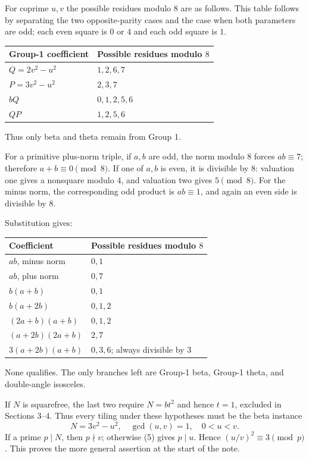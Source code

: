 \documentclass[
  11pt,
]{article}
\begin{document}
For coprime \(u,v\) the possible residues modulo \(8\) are as follows.
This table follows by separating the two opposite-parity cases and the
case when both parameters are odd; each even square is \(0\) or \(4\)
and each odd square is \(1\).

\begin{longtable}[]{@{}ll@{}}
\toprule\noalign{}
Group-1 coefficient & Possible residues modulo \(8\) \\
\midrule\noalign{}
\endhead
\bottomrule\noalign{}
\endlastfoot
\(Q=2v^2-u^2\) & \(1,2,6,7\) \\
\(P=3v^2-u^2\) & \(2,3,7\) \\
\(bQ\) & \(0,1,2,5,6\) \\
\(QP\) & \(1,2,5,6\) \\
\end{longtable}

Thus only beta and theta remain from Group 1.

For a primitive plus-norm triple, if \(a,b\) are odd, the norm modulo
\(8\) forces \(ab\equiv7\); therefore \(a+b\equiv0\pmod8\). If one of
\(a,b\) is even, it is divisible by \(8\): valuation one gives a
nonsquare modulo \(4\), and valuation two gives \(5\pmod8\). For the
minus norm, the corresponding odd product is \(ab\equiv1\), and again an
even side is divisible by \(8\).

Substitution gives:

\begin{longtable}[]{@{}ll@{}}
\toprule\noalign{}
Coefficient & Possible residues modulo \(8\) \\
\midrule\noalign{}
\endhead
\bottomrule\noalign{}
\endlastfoot
\(ab\), minus norm & \(0,1\) \\
\(ab\), plus norm & \(0,7\) \\
\(b(a+b)\) & \(0,1\) \\
\(b(a+2b)\) & \(0,1,2\) \\
\((2a+b)(a+b)\) & \(0,1,2\) \\
\((a+2b)(2a+b)\) & \(2,7\) \\
\(3(a+2b)(a+b)\) & \(0,3,6\); always divisible by \(3\) \\
\end{longtable}

None qualifies. The only branches left are Group-1 beta, Group-1 theta,
and double-angle isosceles.

If \(N\) is squarefree, the last two require \(N=bt^2\) and hence
\(t=1\), excluded in Sections 3--4. Thus every tiling under these
hypotheses must be the beta instance
\[N=3v^2-u^2,\quad \gcd(u,v)=1,\quad 0<u<v.\tag{5}\] If a prime
\(p\mid N\), then \(p\nmid v\); otherwise (5) gives \(p\mid u\). Hence
\((u/v)^2\equiv3\pmod p\). This proves the more general assertion at the
start of the note.
\end{document}
